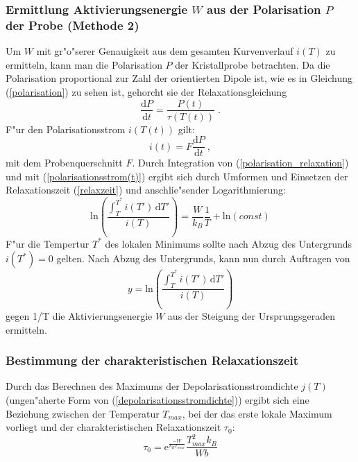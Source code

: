     \subsubsection{Ermittlung Aktivierungsenergie $W$ aus der Polarisation $P$ der Probe (Methode 2)}
      Um $W$ mit gr"o"serer Genauigkeit aus dem gesamten Kurvenverlauf $i(T)$ zu ermitteln, kann man die Polarisation $P$ der Kristallprobe betrachten.
      Da die Polarisation proportional zur Zahl der orientierten Dipole ist, wie es in Gleichung (\ref{polarisation}) zu sehen ist, gehorcht sie der Relaxationsgleichung
      \begin{equation}
        \frac{\text{d}P}{\text{d}t} = \frac{P(t)}{\tau(T(t))} \;.
        \label{polarisation_relaxation}
      \end{equation}
      F"ur den Polarisationsstrom $i(T(t))$ gilt:
      \begin{equation}
        i(t) = F\frac{\text{d}P}{\text{d}t} \: ,
        \label{polarisationsstrom(t)}
      \end{equation}
      mit dem Probenquerschnitt $F$.
      Durch Integration von (\ref{polarisation_relaxation}) und mit (\ref{polarisationsstrom(t)}) ergibt sich durch Umformen und Einsetzen der Relaxationszeit (\ref{relaxzeit}) und anschlie"sender Logarithmierung:
      \begin{equation}
        \text{ln} \left(
        \frac{\int_T^{T^*} i(T') \, \text{d}T'}{i(T)} \right)
        = \frac{W}{k_B}\frac{1}{T} + \text{ln} (const)
        \label{methode2}
      \end{equation}
      F"ur die Tempertur $T^*$ des lokalen Minimums sollte nach Abzug des Untergrunds $i(T^*)=0$ gelten.
      Nach Abzug des Untergrunds, kann nun durch Auftragen von
      \begin{equation}
        y = \text{ln} \left(
        \frac{\int_T^{T^*} i(T') \, \text{d}T'}{i(T)} \right)
      \end{equation}
      gegen 1/T die Aktivierungsenergie $W$ aus der Steigung der Ursprungsgeraden ermitteln.



   \subsubsection{Bestimmung der charakteristischen Relaxationszeit}
      Durch das Berechnen des Maximums der Depolarisationsstromdichte $j(T)$ (ungen"aherte Form von (\ref{depolarisationsstromdichte})) ergibt sich eine Beziehung zwischen der Temperatur $T_{max}$, bei der das erste lokale Maximum vorliegt und der charakteristischen Relaxationszeit $\tau_0$:
      \begin{equation}
        \tau_0 = \text{e}^{\frac{-W}{k_BT_{max}}}\frac{T_{max}^2k_B}{Wb}
        \label{tau_0}
      \end{equation}
